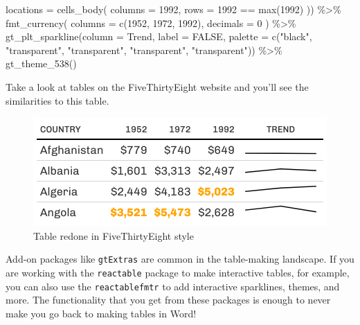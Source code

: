 \documentclass[
]{book}
\newenvironment{Shaded}{\begin{snugshade}}{\end{snugshade}}
\newcommand{\AttributeTok}[1]{\textcolor[rgb]{0.77,0.63,0.00}{#1}}
\newcommand{\ConstantTok}[1]{\textcolor[rgb]{0.00,0.00,0.00}{#1}}
\newcommand{\DecValTok}[1]{\textcolor[rgb]{0.00,0.00,0.81}{#1}}
\newcommand{\FunctionTok}[1]{\textcolor[rgb]{0.00,0.00,0.00}{#1}}
\newcommand{\NormalTok}[1]{#1}
\newcommand{\SpecialCharTok}[1]{\textcolor[rgb]{0.00,0.00,0.00}{#1}}
\newcommand{\StringTok}[1]{\textcolor[rgb]{0.31,0.60,0.02}{#1}}
\begin{document}
\begin{Shaded}
\begin{Highlighting}[]
            \AttributeTok{locations =} \FunctionTok{cells\_body}\NormalTok{(}
              \AttributeTok{columns =} \StringTok{\textasciigrave{}}\AttributeTok{1992}\StringTok{\textasciigrave{}}\NormalTok{,}
              \AttributeTok{rows =} \StringTok{\textasciigrave{}}\AttributeTok{1992}\StringTok{\textasciigrave{}} \SpecialCharTok{==} \FunctionTok{max}\NormalTok{(}\StringTok{\textasciigrave{}}\AttributeTok{1992}\StringTok{\textasciigrave{}}\NormalTok{)}
\NormalTok{            )) }\SpecialCharTok{\%\textgreater{}\%} 
  \FunctionTok{fmt\_currency}\NormalTok{(}
    \AttributeTok{columns =} \FunctionTok{c}\NormalTok{(}\StringTok{\textasciigrave{}}\AttributeTok{1952}\StringTok{\textasciigrave{}}\NormalTok{, }\StringTok{\textasciigrave{}}\AttributeTok{1972}\StringTok{\textasciigrave{}}\NormalTok{, }\StringTok{\textasciigrave{}}\AttributeTok{1992}\StringTok{\textasciigrave{}}\NormalTok{),}
    \AttributeTok{decimals =} \DecValTok{0}
\NormalTok{  ) }\SpecialCharTok{\%\textgreater{}\%} 
  \FunctionTok{gt\_plt\_sparkline}\NormalTok{(}\AttributeTok{column =}\NormalTok{ Trend,}
                   \AttributeTok{label =} \ConstantTok{FALSE}\NormalTok{,}
                   \AttributeTok{palette =} \FunctionTok{c}\NormalTok{(}\StringTok{"black"}\NormalTok{, }\StringTok{"transparent"}\NormalTok{, }\StringTok{"transparent"}\NormalTok{, }\StringTok{"transparent"}\NormalTok{, }\StringTok{"transparent"}\NormalTok{)) }\SpecialCharTok{\%\textgreater{}\%} 
  \FunctionTok{gt\_theme\_538}\NormalTok{()}
\end{Highlighting}
\end{Shaded}

Take a look at tables on the FiveThirtyEight website and you'll see the similarities to this table.

\begin{figure}
\includegraphics[width=1\linewidth]{nostarch/temp/F05012} \caption{Table redone in FiveThirtyEight style}\label{fig:unnamed-chunk-43}
\end{figure}

Add-on packages like \texttt{gtExtras} are common in the table-making landscape. If you are working with the \texttt{reactable} package to make interactive tables, for example, you can also use the \texttt{reactablefmtr} to add interactive sparklines, themes, and more. The functionality that you get from these packages is enough to never make you go back to making tables in Word!
\end{document}
